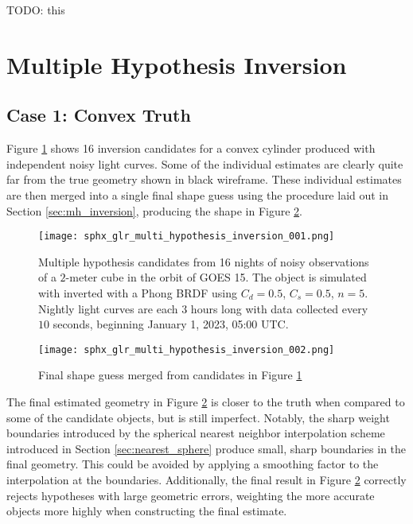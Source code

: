 TODO: this

\section{Multiple Hypothesis Inversion}

\subsection{Case 1: Convex Truth}

Figure \ref{fig:multi_hyp_candidates_cvx} shows 16 inversion candidates for a convex cylinder produced with independent noisy light curves. Some of the individual estimates are clearly quite far from the true geometry shown in black wireframe. These individual estimates are then merged into a single final shape guess using the procedure laid out in Section \ref{sec:mh_inversion}, producing the shape in Figure \ref{fig:multi_hyp_final_cvx}.

\begin{figure}[!htb]
    \centering
    \texttt{[image: sphx\_glr\_multi\_hypothesis\_inversion\_001.png]}
    \caption{Multiple hypothesis candidates from 16 nights of noisy observations of a $2$-meter cube in the orbit of GOES 15. The object is simulated with inverted with a Phong BRDF using $C_d=0.5$, $C_s=0.5$, $n=5$. Nightly light curves are each $3$ hours long with data collected every $10$ seconds, beginning January 1, 2023, 05:00 UTC.}
    \label{fig:multi_hyp_candidates_cvx}
\end{figure}

\begin{figure}[!htb]
  \centering
  \texttt{[image: sphx\_glr\_multi\_hypothesis\_inversion\_002.png]}
  \caption{Final shape guess merged from candidates in Figure \ref{fig:multi_hyp_candidates_cvx}}
  \label{fig:multi_hyp_final_cvx}
\end{figure}

The final estimated geometry in Figure \ref{fig:multi_hyp_final_cvx} is closer to the truth when compared to some of the candidate objects, but is still imperfect. Notably, the sharp weight boundaries introduced by the spherical nearest neighbor interpolation scheme introduced in Section \ref{sec:nearest_sphere} produce small, sharp boundaries in the final geometry. This could be avoided by applying a smoothing factor to the interpolation at the boundaries. Additionally, the final result in Figure \ref{fig:multi_hyp_final_cvx} correctly rejects hypotheses with large geometric errors, weighting the more accurate objects more highly when constructing the final estimate.

